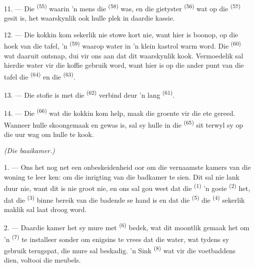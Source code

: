 \VUsaut{4.0mm}
\VUsaut{3.0mm}

11. --- Die  \textsuperscript{(55)} waarin 'n mens die 
\textsuperscript{(58)} was, en die gietyster  \textsuperscript{(56)} wat op
die  \textsuperscript{(57)} gesit is, het waarskynlik ook hulle plek in
daardie kassie.

12. --- Die kokkin kom sekerlik nie stowe kort nie, want hier is boonop, op die hoek van
die tafel, 'n  \textsuperscript{(59)} waarop water in 'n klein kastrol
warm word. Die  \textsuperscript{(60)} wat daaruit ontsnap, dui vir ons aan
dat dit waarskynlik kook. Vermoedelik sal hierdie water vir die koffie gebruik word, want
hier is op die ander punt van die tafel die  \textsuperscript{(64)} en
die  \textsuperscript{(63)}.

13. --- Die stofie is met die  \textsuperscript{(62)} verbind deur 'n
lang  \textsuperscript{(61)}.

14. --- Die  \textsuperscript{(66)} wat die kokkin kom help, maak die
groente vir die ete gereed. Wanneer hulle skoongemaak en gewas is, sal sy hulle in die
 \textsuperscript{(65)} sit terwyl sy op die uur wag om hulle te kook.

\VUsaut{4.0mm}
{\centering\fontsize{10.2pt}{10.2pt}\selectfont{}
 \textit{(Die baaikamer.)}\par}
\VUsaut{3.0mm}

1. --- Ons het nog net een onbeskeidenheid oor om die vernaamste kamers van die woning
te leer ken: om die inrigting van die badkamer te sien. Dit sal nie lank duur nie, want
dit is nie groot nie, en ons sal gou weet dat die  \textsuperscript{(1)} 'n
goeie  \textsuperscript{(2)} het, dat die 
\textsuperscript{(3)} binne bereik van die badende se hand is en dat die
 \textsuperscript{(5)} die  \textsuperscript{(4)}
sekerlik maklik sal laat droog word.

2. --- Daardie kamer het sy mure met  \textsuperscript{(6)} bedek, wat dit
moontlik gemaak het om 'n  \textsuperscript{(7)} te installeer
sonder om enigsins te vrees dat die water, wat tydens sy gebruik terugspat, die mure sal
beskadig. 'n Sink  \textsuperscript{(8)} wat vir die voetbaddens dien,
voltooi die meubels.
\VUsaut{6.0mm}
\VUfilet{22mm}

